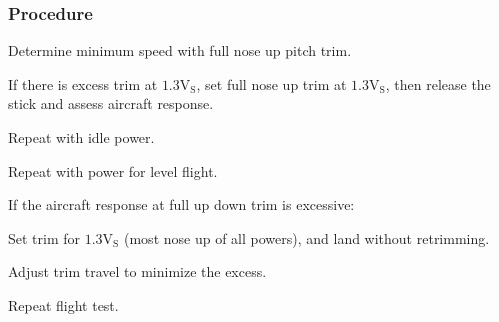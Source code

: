 % 
% 
%
\subsubsection*{Procedure}
  \begin{compactenum}
    \item Determine minimum speed with full nose up pitch trim.
    \item If there is excess trim at $\mathrm{1.3V_{S}}$, set full nose up trim at $\mathrm{1.3V_{S}}$, then release the stick and assess aircraft response.
    \item Repeat with idle power.
    \item Repeat with power for level flight.
    \item If the aircraft response at full up down trim is excessive:
    \begin{compactenum}
      \item Set trim for $\mathrm{1.3V_{S}}$ (most nose up of all powers), and land without retrimming.  
      \item Adjust trim travel to minimize the excess.
      \item Repeat flight test.
      \end{compactenum}
    \end{compactenum}
